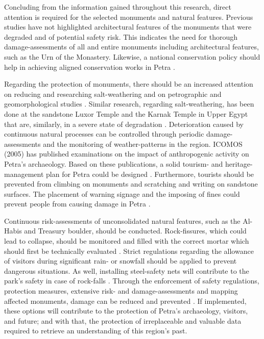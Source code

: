 Concluding  from the information gained throughout this research,
direct attention is required for the selected monuments and natural features.
Previous studies have not highlighted architectural features of the monuments that were degraded and of potential safety risk.
This indicates the need for thorough damage-assessments of all and entire monuments including architectural features,
such as the Urn of the Monastery.
Likewise, a national conservation policy should help in achieving aligned conservation works in Petra \parencite[267--284]{balaawi2011}.

Regarding the protection of monuments, there should be an increased attention on reducing and researching salt-weathering and
on petrographic and geomorphological studies \parencite[347--348]{heinrichs2013a}.
Similar research, regarding salt-weathering, has been done at the sandstone Luxor Temple and
the Karnak Temple in Upper Egypt that are, similarly, in a severe state of degradation \parencite[1009--1102]{fhb03}.
Deterioration caused by continuous natural processes can be controlled through periodic damage-assessments and
the monitoring of weather-patterns in the region.
ICOMOS (2005) has published examinations on the impact of anthropogenic activity on Petra’s archaeology.
Based on these publications, a solid tourism- and
heritage-management plan for Petra could be designed \parencite[499--501]{comer2011}.
Furthermore, tourists should be prevented from climbing on monuments and scratching and writing on sandstone surfaces.
The placement of warning signage and the imposing of fines could prevent people from causing damage in
Petra \parencite[80--85]{mustafa2013}. 

Continuous risk-assessments of unconsolidated natural features, such as the Al-Habis and Treasury boulder, should be conducted.
Rock-fissures, which could lead to collapse, should be monitored and filled with
the correct mortar which should first be technically evaluated \parencite[926--932]{alsaad2001}.
Strict regulations regarding the allowance of visitors during significant rain- or snowfall should be applied to prevent dangerous situations.
As well, installing steel-safety nets  will contribute to the park’s safety in case of
rock-falls \parencite[2617--2639]{volkwein2011}.
Through the enforcement of safety regulations, protection measures, extensive risk- and damage-assessments and mapping affected monuments,
damage can be reduced and prevented \parencites[127]{alshawabkehy2010}[441--446]{delmonaco2013}.
If implemented, these options will contribute to the protection of Petra’s archaeology, visitors, and future;
and with that, the protection of irreplaceable and valuable data required to retrieve an understanding of this region’s past.

